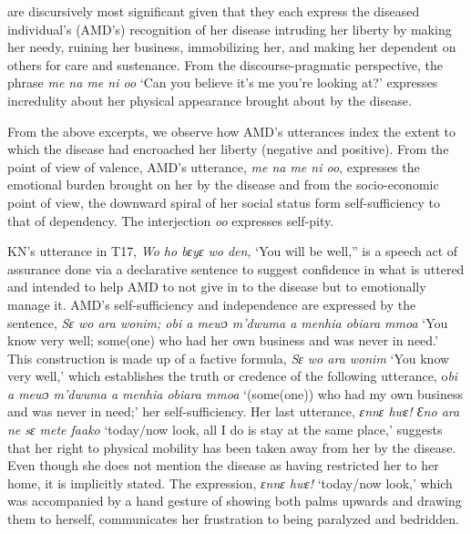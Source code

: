 \documentclass[output=paper,colorlinks,citecolor=brown]{langscibook}
\begin{document}
are discursively most significant given that they each express the diseased individual’s (AMD’s) recognition of her disease intruding her liberty by making her needy, ruining her business, immobilizing her, and making her dependent on others for care and sustenance. From the discourse-pragmatic perspective, the phrase \textit{me na me ni oo} ‘Can you believe it’s me you’re looking at?’ expresses incredulity about her physical appearance brought about by the disease. 

From the above excerpts, we observe how AMD’s utterances index the extent to which the disease had encroached her liberty (negative and positive). From the point of view of valence, AMD’s utterance, \textit{me na me ni oo}, expresses the emotional burden brought on her by the disease and from the socio-economic point of view, the downward spiral of her social status form self-sufficiency to that of dependency. The interjection \textit{oo} expresses self-pity.

KN’s utterance in T17, \textit{Wo ho bɛyɛ wo den, } ‘You will be well,” is a speech act of assurance done via a declarative sentence to suggest confidence in what is uttered and intended to help AMD to not give in to the disease but to emotionally manage it. AMD’s self-sufficiency and independence are expressed by the sentence, \textit{Sɛ wo ara wonim; obi a mewɔ m’dwuma a menhia obiara mmoa} ‘You know very well; some(one) who had her own business and was never in need.’ This construction is made up of a factive formula, \textit{Sɛ wo ara wonim} ‘You know very well,’ which establishes the truth or credence of the following utterance, o\textit{bi a mewɔ m’dwuma a menhia obiara mmoa} ‘(some(one)) who had my own business and was never in need;’ her self-sufficiency. Her last utterance, \textit{ɛnnɛ hwɛ! Ɛno ara ne sɛ mete faako} ‘today/now look, all I do is stay at the same place,’ suggests that her right to physical mobility has been taken away from her by the disease. Even though she does not mention the disease as having restricted her to her home, it is implicitly stated. The expression, \textit{ɛnnɛ hwɛ! }‘today/now look,’ which was accompanied by a hand gesture of showing both palms upwards and drawing them to herself, communicates her frustration to being paralyzed and bedridden. 
\end{document}
